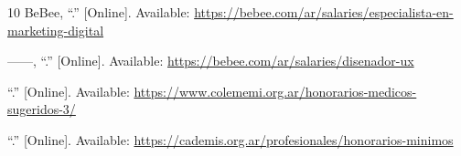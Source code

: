 \begin{thebibliography}{10}
\BIBentryALTinterwordspacing
BeBee, ``.''
  [Online]. Available:
  \url{https://bebee.com/ar/salaries/especialista-en-marketing-digital}
\BIBentrySTDinterwordspacing

\BIBentryALTinterwordspacing
------, ``.'' [Online]. Available:
  \url{https://bebee.com/ar/salaries/disenador-ux}
\BIBentrySTDinterwordspacing

\BIBentryALTinterwordspacing
``.'' [Online]. Available:
  \url{https://www.colememi.org.ar/honorarios-medicos-sugeridos-3/}
\BIBentrySTDinterwordspacing

\BIBentryALTinterwordspacing
``.'' [Online]. Available:
  \url{https://cademis.org.ar/profesionales/honorarios-minimos}
\BIBentrySTDinterwordspacing

\end{thebibliography}
